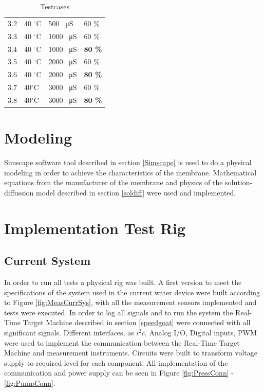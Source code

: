 \begin{table}[h]
\begin{tabular}{|p{1.4cm}||p{2cm}|p{3.2cm}|p{1.8cm}|}
 3.2 & 40 $^\circ$C &500 \SI{}{\micro\siemens}& 60 \%\\
 3.3 & 40 $^\circ$C  & 1000 \SI{}{\micro\siemens}& 60 \%\\
 3.4 & 40 $^\circ$C  & 1000 \SI{}{\micro\siemens}& \textbf{80 \%}\\
 3.5 & 40 $^\circ$C&2000 \SI{}{\micro\siemens}& 60 \%\\
 3.6 & 40 $^\circ$C &2000 \SI{}{\micro\siemens}& \textbf{80 \%}\\
 3.7 & 40$^\circ$C &3000 \SI{}{\micro\siemens}& 60 \%\\
 3.8 & 40$^\circ$C &3000 \SI{}{\micro\siemens}& \textbf{80 \%}\\
\hline
\end{tabular}
\caption{Testcases}
    \label{tab:testcases} 
\end{table}


\section{Modeling}
Simscape software tool described in section \ref{Simscape} is used to do a physical modeling in order to achieve the characteristics of the membrane. Mathematical equations from the manufacturer of the membrane and physics of the solution-diffussion model described in section \ref{soldiff} were used and implemented. 

\section{Implementation Test Rig}
\subsection{Current System}
In order to run all tests a physical rig was built. A first version to meet the specifications of the system used in the current water device were built according to Figure \ref{fig:MeasCurrSys}, with all the measurement sensors implemented and tests were executed.
In order to log all signals and to run the system the Real-Time Target Machine described in section \ref{speedgoat} were connected with all significant signals.
Different interfaces, as $i^{2}c$, Analog I/O, Digital inputs, PWM were used to implement the communication between the Real-Time Target Machine and measurement instruments. Circuits were built to transform voltage supply to required level for each component. All implementation of the communication and power supply can be seen in Figure \ref{fig:PressConn} - \ref{fig:PumpConn}.

